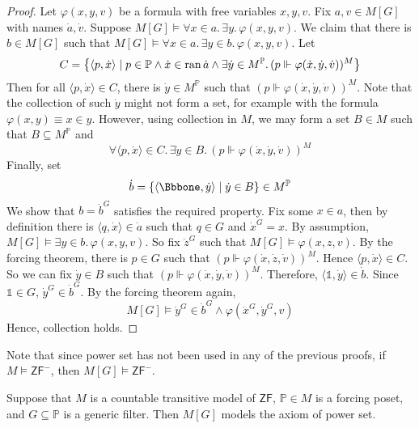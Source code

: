 \begin{proof}
    Let \( \varphi(x, y, v) \) be a formula with free variables \( x, y, v \).
    Fix \( a, v \in M[G] \) with names \( \dot a, \dot v \).
    Suppose \( M[G] \vDash \forall x \in a.\, \exists y.\, \varphi(x, y, v) \).
    We claim that there is \( b \in M[G] \) such that \( M[G] \vDash \forall x \in a.\, \exists y \in b.\, \varphi(x, y, v) \).
    Let
    \[ C = \qty{\langle p, \dot x \rangle \mid p \in \mathbb P \wedge \dot x \in \operatorname{ran}\dot a \wedge \exists \dot y \in M^{\mathbb P}.\, (p \Vdash \varphi(\dot x, \dot y, \dot v))^M} \]
    Then for all \( \langle p, \dot x \rangle \in C \), there is \( \dot y \in M^{\mathbb P} \) such that \( (p \Vdash \varphi(\dot x, \dot y, \dot v))^M \).
    Note that the collection of such \( \dot y \) might not form a set, for example with the formula \( \varphi(x, y) \equiv x \in y \).
    However, using collection in \( M \), we may form a set \( B \in M \) such that \( B \subseteq M^{\mathbb P} \) and
    \[ \forall \langle p, \dot x \rangle \in C.\, \exists \dot y \in B.\, (p \Vdash \varphi(\dot x, \dot y, \dot v))^M \]
    Finally, set
    \[ \dot b = \qty{\langle \Bbbone, \dot y \rangle \mid \dot y \in B} \in M^{\mathbb P} \]
    We show that \( b = \dot b^G \) satisfies the required property.
    Fix some \( x \in a \), then by definition there is \( \langle q, \dot x \rangle \in \dot a \) such that \( q \in G \) and \( \dot x^G = x \).
    By assumption, \( M[G] \vDash \exists y \in b.\, \varphi(x, y, v) \).
    So fix \( \dot z^G \) such that \( M[G] \vDash \varphi(x, z, v) \).
    By the forcing theorem, there is \( p \in G \) such that \( (p \Vdash \varphi(\dot x, \dot z, \dot v))^M \).
    Hence \( \langle p, \dot x \rangle \in C \).
    So we can fix \( \dot y \in B \) such that \( (p \Vdash \varphi(\dot x, \dot y, \dot v))^M \).
    Therefore, \( \langle \Bbbone, \dot y \rangle \in \dot b \).
    Since \( \Bbbone \in G \), \( \dot y^G \in \dot b^G \).
    By the forcing theorem again,
    \[ M[G] \vDash \dot y^G \in \dot b^G \wedge \varphi(\dot x^G, \dot y^G, v) \]
    Hence, collection holds.
\end{proof}
Note that since power set has not been used in any of the previous proofs, if \( M \vDash \mathsf{ZF}^- \), then \( M[G] \vDash \mathsf{ZF}^- \).
\begin{lemma}
    Suppose that \( M \) is a countable transitive model of \( \mathsf{ZF} \), \( \mathbb P \in M \) is a forcing poset, and \( G \subseteq \mathbb P \) is a generic filter.
    Then \( M[G] \) models the axiom of power set.
\end{lemma}
